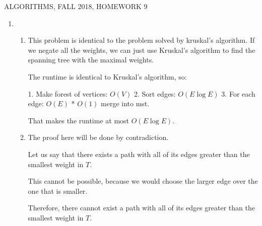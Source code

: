 \documentclass[12pt]{article}
\begin{document}
  
\pagestyle{empty}
 

\begin{center} ALGORITHMS,   FALL 2018, HOMEWORK 9
\end{center}

\begin{enumerate}

\item
    
\begin{enumerate}
    \item
    This problem is identical to the problem solved by kruskal's algorithm. If we negate all the weights, we can just use Kruskal's algorithm to find the
    spanning tree with the maximal weights.


    The runtime is identical to Kruskal's algorithm, so:

    1. Make forest of vertices: $O(V)$
    2. Sort edges: $O(E\log E)$
    3. For each edge: $O(E)$ * $O(1)$ merge into mst.

    That makes the runtime at most $O(E\log E)$.

    \pagebreak
    
    \item

    The proof here will be done by contradiction.

    Let us say that there exists a path with all of its edges greater than the smallest weight in $T$.
    
    This cannot be possible, because we would choose the larger edge over the one that is smaller.

    Therefore, there cannot exist a path with all of its edges greater than the smallest weight in $T$.

    \end{enumerate}
\end{enumerate}
\end{document}
